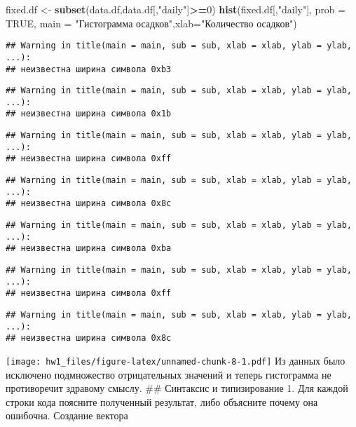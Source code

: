 \documentclass[]{article}
\newenvironment{Shaded}{\begin{snugshade}}{\end{snugshade}}
\newcommand{\KeywordTok}[1]{\textcolor[rgb]{0.13,0.29,0.53}{\textbf{#1}}}
\newcommand{\DataTypeTok}[1]{\textcolor[rgb]{0.13,0.29,0.53}{#1}}
\newcommand{\DecValTok}[1]{\textcolor[rgb]{0.00,0.00,0.81}{#1}}
\newcommand{\StringTok}[1]{\textcolor[rgb]{0.31,0.60,0.02}{#1}}
\newcommand{\OtherTok}[1]{\textcolor[rgb]{0.56,0.35,0.01}{#1}}
\newcommand{\OperatorTok}[1]{\textcolor[rgb]{0.81,0.36,0.00}{\textbf{#1}}}
\newcommand{\NormalTok}[1]{#1}
\begin{document}
\begin{Shaded}
\begin{Highlighting}[]
\NormalTok{fixed.df <-}\StringTok{ }\KeywordTok{subset}\NormalTok{(data.df,data.df[,}\StringTok{"daily"}\NormalTok{]}\OperatorTok{>=}\DecValTok{0}\NormalTok{)}
\KeywordTok{hist}\NormalTok{(fixed.df[,}\StringTok{"daily"}\NormalTok{], }\DataTypeTok{prob =} \OtherTok{TRUE}\NormalTok{, }\DataTypeTok{main =} \StringTok{"Гистограмма осадков"}\NormalTok{,}\DataTypeTok{xlab=}\StringTok{"Количество осадков"}\NormalTok{)}
\end{Highlighting}
\end{Shaded}

\begin{verbatim}
## Warning in title(main = main, sub = sub, xlab = xlab, ylab = ylab, ...):
## неизвестна ширина символа 0xb3
\end{verbatim}

\begin{verbatim}
## Warning in title(main = main, sub = sub, xlab = xlab, ylab = ylab, ...):
## неизвестна ширина символа 0x1b
\end{verbatim}

\begin{verbatim}
## Warning in title(main = main, sub = sub, xlab = xlab, ylab = ylab, ...):
## неизвестна ширина символа 0xff
\end{verbatim}

\begin{verbatim}
## Warning in title(main = main, sub = sub, xlab = xlab, ylab = ylab, ...):
## неизвестна ширина символа 0x8c
\end{verbatim}

\begin{verbatim}
## Warning in title(main = main, sub = sub, xlab = xlab, ylab = ylab, ...):
## неизвестна ширина символа 0xba
\end{verbatim}

\begin{verbatim}
## Warning in title(main = main, sub = sub, xlab = xlab, ylab = ylab, ...):
## неизвестна ширина символа 0xff
\end{verbatim}

\begin{verbatim}
## Warning in title(main = main, sub = sub, xlab = xlab, ylab = ylab, ...):
## неизвестна ширина символа 0x8c
\end{verbatim}

\texttt{[image: hw1\_files/figure-latex/unnamed-chunk-8-1.pdf]} Из данных
было исключено подмножество отрицательных значений и теперь гистограмма
не противоречит здравому смыслу. \#\# Синтаксис и типизирование 1. Для
каждой строки кода поясните полученный результат, либо объясните почему
она ошибочна. Создание вектора
\end{document}
